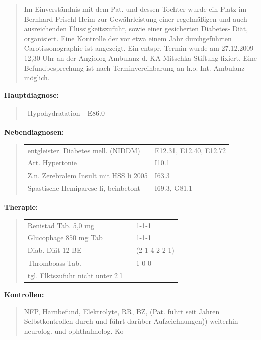 {\begin{quote}
  Im Einverständnis mit dem Pat. und dessen Tochter wurde ein Platz im
  Bernhard-Prischl-Heim zur Gewährleistung einer regelmäßigen und auch
  ausreichenden Flüssigkeitszufuhr, sowie einer gesicherten Diabetes- Diät,
  organisiert. Eine Kontrolle der vor etwa einem Jahr durchgeführten 
  Carotissonographie ist angezeigt. Ein entspr. Termin wurde am
  27.12.2009  12,30 Uhr an der Angiolog Ambulanz d. KA Mitschka-Stiftung
  fixiert. Eine Befund\-be\-sprech\-ung ist nach Terminvereinbarung an h.o. Int.
  Ambulanz möglich.
\end{quote}

\MarginNo{\Z{}}
{\bfseries Hauptdiagnose:}

\begin{quote}
\begin{tabular}{ll}
Hypohydratation & E86.0
\\
\end{tabular}
\end{quote}

{\bfseries Nebendiagnosen:}

\begin{quote}
\begin{tabular}{ll}
entgleister. Diabetes mell. (NIDDM) & E12.31, E12.40, E12.72 
\\
Art. Hypertonie & I10.1
\\
Z.n. Zerebralem Insult mit HSS li 2005& I63.3
\\
Spastische Hemiparese li, beinbetont&I69.3, G81.1
\\
\end{tabular}
\end{quote}



{\bfseries Therapie:}

\begin{quote}
\begin{tabular}{lll}
Renistad Tab. 5,0 mg && 1-1-1 
\\
Glucophage 850 mg Tab && 1-1-1 
\\
Diab. Diät 12 BE&&(2-1-4-2-2-1) 
\\
Thromboass Tab.&&1-0-0 
\\
tgl. Flktszufuhr nicht unter 2 l&&
\end{tabular}
\end{quote}




{\bfseries Kontrollen:}

\begin{quote}
 NFP, Harnbefund, Elektrolyte, RR, BZ, (Pat. führt seit
Jahren Selbstkontrollen durch und führt darüber Aufzeichnungen)) weiterhin neurolog. und
ophthalmolog. Ko
\end{quote}









}
